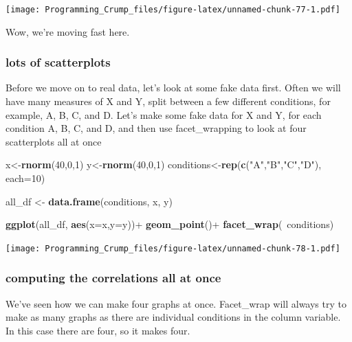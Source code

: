 \documentclass[]{book}
\newenvironment{Shaded}{\begin{snugshade}}{\end{snugshade}}
\newcommand{\KeywordTok}[1]{\textcolor[rgb]{0.13,0.29,0.53}{\textbf{{#1}}}}
\newcommand{\DataTypeTok}[1]{\textcolor[rgb]{0.13,0.29,0.53}{{#1}}}
\newcommand{\DecValTok}[1]{\textcolor[rgb]{0.00,0.00,0.81}{{#1}}}
\newcommand{\StringTok}[1]{\textcolor[rgb]{0.31,0.60,0.02}{{#1}}}
\newcommand{\NormalTok}[1]{{#1}}
\theoremstyle{definition}
\theoremstyle{definition}
\theoremstyle{definition}
\theoremstyle{remark}
\begin{document}
\texttt{[image: Programming\_Crump\_files/figure-latex/unnamed-chunk-77-1.pdf]}

Wow, we're moving fast here.

\subsubsection{lots of scatterplots}\label{lots-of-scatterplots}

Before we move on to real data, let's look at some fake data first.
Often we will have many measures of X and Y, split between a few
different conditions, for example, A, B, C, and D. Let's make some fake
data for X and Y, for each condition A, B, C, and D, and then use
facet\_wrapping to look at four scatterplots all at once

\begin{Shaded}
\begin{Highlighting}[]
\NormalTok{x<-}\KeywordTok{rnorm}\NormalTok{(}\DecValTok{40}\NormalTok{,}\DecValTok{0}\NormalTok{,}\DecValTok{1}\NormalTok{)}
\NormalTok{y<-}\KeywordTok{rnorm}\NormalTok{(}\DecValTok{40}\NormalTok{,}\DecValTok{0}\NormalTok{,}\DecValTok{1}\NormalTok{)}
\NormalTok{conditions<-}\KeywordTok{rep}\NormalTok{(}\KeywordTok{c}\NormalTok{(}\StringTok{"A"}\NormalTok{,}\StringTok{"B"}\NormalTok{,}\StringTok{"C"}\NormalTok{,}\StringTok{"D"}\NormalTok{), }\DataTypeTok{each=}\DecValTok{10}\NormalTok{)}

\NormalTok{all_df <-}\StringTok{ }\KeywordTok{data.frame}\NormalTok{(conditions, x, y)}

\KeywordTok{ggplot}\NormalTok{(all_df, }\KeywordTok{aes}\NormalTok{(}\DataTypeTok{x=}\NormalTok{x,}\DataTypeTok{y=}\NormalTok{y))+}
\StringTok{  }\KeywordTok{geom_point}\NormalTok{()+}
\StringTok{  }\KeywordTok{facet_wrap}\NormalTok{(~conditions)}
\end{Highlighting}
\end{Shaded}

\texttt{[image: Programming\_Crump\_files/figure-latex/unnamed-chunk-78-1.pdf]}

\subsubsection{computing the correlations all at
once}\label{computing-the-correlations-all-at-once}

We've seen how we can make four graphs at once. Facet\_wrap will always
try to make as many graphs as there are individual conditions in the
column variable. In this case there are four, so it makes four.
\end{document}
